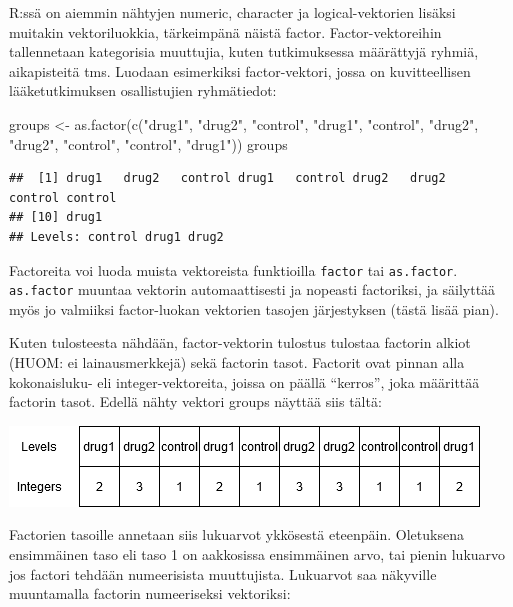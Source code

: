 \documentclass[
]{book}
\newenvironment{Shaded}{\begin{snugshade}}{\end{snugshade}}
\newcommand{\FunctionTok}[1]{\textcolor[rgb]{0.00,0.00,0.00}{#1}}
\newcommand{\NormalTok}[1]{#1}
\newcommand{\OtherTok}[1]{\textcolor[rgb]{0.56,0.35,0.01}{#1}}
\newcommand{\StringTok}[1]{\textcolor[rgb]{0.31,0.60,0.02}{#1}}
\begin{document}
R:ssä on aiemmin nähtyjen numeric, character ja logical-vektorien lisäksi muitakin vektoriluokkia, tärkeimpänä näistä factor. Factor-vektoreihin tallennetaan kategorisia muuttujia, kuten tutkimuksessa määrättyjä ryhmiä, aikapisteitä tms. Luodaan esimerkiksi factor-vektori, jossa on kuvitteellisen lääketutkimuksen osallistujien ryhmätiedot:

\begin{Shaded}
\begin{Highlighting}[]
\NormalTok{groups }\OtherTok{\textless{}{-}} \FunctionTok{as.factor}\NormalTok{(}\FunctionTok{c}\NormalTok{(}\StringTok{"drug1"}\NormalTok{, }\StringTok{"drug2"}\NormalTok{, }\StringTok{"control"}\NormalTok{, }\StringTok{"drug1"}\NormalTok{, }\StringTok{"control"}\NormalTok{,}
                      \StringTok{"drug2"}\NormalTok{, }\StringTok{"drug2"}\NormalTok{, }\StringTok{"control"}\NormalTok{, }\StringTok{"control"}\NormalTok{, }\StringTok{"drug1"}\NormalTok{))}
\NormalTok{groups}
\end{Highlighting}
\end{Shaded}

\begin{verbatim}
##  [1] drug1   drug2   control drug1   control drug2   drug2   control control
## [10] drug1  
## Levels: control drug1 drug2
\end{verbatim}

Factoreita voi luoda muista vektoreista funktioilla \texttt{factor} tai \texttt{as.factor}. \texttt{as.factor} muuntaa vektorin automaattisesti ja nopeasti factoriksi, ja säilyttää myös jo valmiiksi factor-luokan vektorien tasojen järjestyksen (tästä lisää pian).

Kuten tulosteesta nähdään, factor-vektorin tulostus tulostaa factorin alkiot (HUOM: ei lainausmerkkejä) sekä factorin tasot. Factorit ovat pinnan alla kokonaisluku- eli integer-vektoreita, joissa on päällä ``kerros'', joka määrittää factorin tasot. Edellä nähty vektori groups näyttää siis tältä:

\includegraphics{files/05-statistics/factor.png}

Factorien tasoille annetaan siis lukuarvot ykkösestä eteenpäin. Oletuksena ensimmäinen taso eli taso 1 on aakkosissa ensimmäinen arvo, tai pienin lukuarvo jos factori tehdään numeerisista muuttujista. Lukuarvot saa näkyville muuntamalla factorin numeeriseksi vektoriksi:
\end{document}
